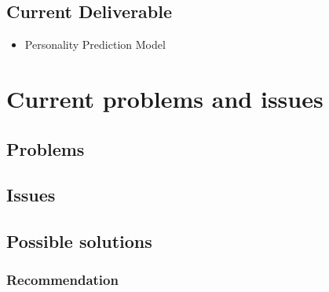\documentclass[a4paper, 12pt, onepage]{article}
\begin{document}
	\subsection{Current Deliverable}
	\begin{itemize}
	\item Personality Prediction Model
	\end{itemize}


      \cleardoublepage
      \section{Current problems and issues}
      \subsection{Problems}
      \subsection{Issues}
      \subsection{Possible solutions}
      \subsubsection{Recommendation}
\end{document}

